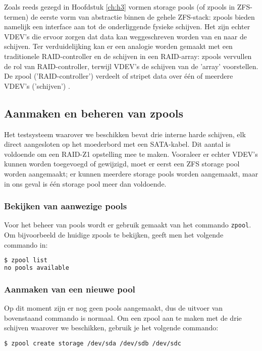 Zoals reeds gezegd in Hoofdstuk \ref{ch:h3} vormen storage pools (of zpools in ZFS-termen) de eerste vorm van abstractie binnen de gehele ZFS-stack: zpools bieden namelijk een interface aan tot de onderliggende fysieke schijven. Het zijn echter VDEV's die ervoor zorgen dat data kan weggeschreven worden van en naar de schijven. Ter verduidelijking kan er een analogie worden gemaakt met een traditionele RAID-controller en de schijven in een RAID-array: zpools vervullen de rol van RAID-controller, terwijl VDEV's de schijven van de 'array' voorstellen. De zpool ('RAID-controller') verdeelt of stripet data over één of meerdere VDEV's ('schijven') \autocite{Lucas2015}.

\subsection{Aanmaken en beheren van zpools}

Het testsysteem waarover we beschikken bevat drie interne harde schijven, elk direct aangesloten op het moederbord met een SATA-kabel. Dit aantal is voldoende om een RAID-Z1 opstelling mee te maken. Vooraleer er echter VDEV's kunnen worden toegevoegd of gewijzigd, moet er eerst een ZFS storage pool worden aangemaakt; er kunnen meerdere storage pools worden aangemaakt, maar in ons geval is één storage pool meer dan voldoende.

\subsubsection{Bekijken van aanwezige pools}

Voor het beheer van pools wordt er gebruik gemaakt van het commando \texttt{zpool}. Om bijvoorbeeld de huidige zpools te bekijken, geeft men het volgende commando in:

\begin{lstlisting}[language=bash,style=command_style]
$ zpool list
no pools available
\end{lstlisting}

\subsubsection{Aanmaken van een nieuwe pool}

Op dit moment zijn er nog geen pools aangemaakt, dus de uitvoer van bovenstaand commando is normaal. Om een zpool aan te maken met de drie schijven waarover we beschikken, gebruik je het volgende commando:

\begin{lstlisting}[language=bash,style=command_style]
$ zpool create storage /dev/sda /dev/sdb /dev/sdc
\end{lstlisting}

